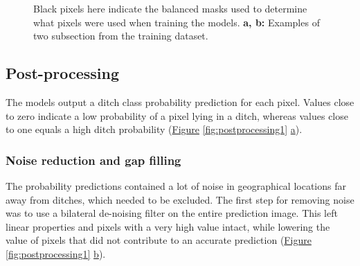 \documentclass[]{interact}
\theoremstyle{plain}%
\theoremstyle{definition}
\theoremstyle{remark}
\begin{document}
\begin{figure} [!htb]
    \caption{Black pixels here indicate the balanced masks used to determine what pixels were used when training the models. \textbf{a, b: }Examples of two subsection from the training dataset.}
    \label{fig:balancedmasks}
\end{figure}

\subsection{Post-processing}
The models output a ditch class probability prediction for each pixel. Values close to zero indicate a low probability of a pixel lying in a ditch, whereas values close to one equals a high ditch probability (\hyperref[fig:postprocessing1]{Figure} \ref{fig:postprocessing1} \hyperref[fig:postprocessing1]{a}).

\subsubsection{Noise reduction and gap filling}
The probability predictions contained a lot of noise in geographical locations far away from ditches, which needed to be excluded. The first step for removing noise was to use a bilateral de-noising filter on the entire prediction image. This left linear properties and pixels with a very high value intact, while lowering the value of pixels that did not contribute to an accurate prediction (\hyperref[fig:postprocessing1]{Figure} \ref{fig:postprocessing1} \hyperref[fig:postprocessing1]{b}).
\end{document}
